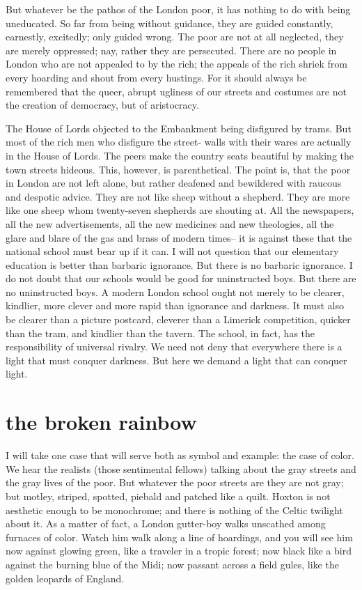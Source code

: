 \documentclass[final,10pt,letterpaper,twocolumn,openany]{book}
\begin{document}
But whatever be the pathos of the London poor, it has nothing to do
with being uneducated. So far from being without guidance, they are
guided constantly, earnestly, excitedly; only guided wrong. The poor are
not at all neglected, they are merely oppressed; nay, rather they are
persecuted. There are no people in London who are not appealed to by the
rich; the appeals of the rich shriek from every hoarding and shout from
every hustings. For it should always be remembered that the queer, abrupt
ugliness of our streets and costumes are not the creation of democracy, but
of aristocracy. 

The House of Lords objected to the Embankment being
disfigured by trams. But most of the rich men who disfigure the street-
walls with their wares are actually in the House of Lords. The peers make
the country seats beautiful by making the town streets hideous. This,
however, is parenthetical. The point is, that the poor in London are not left
alone, but rather deafened and bewildered with raucous and despotic
advice. They are not like sheep without a shepherd. They are more like
one sheep whom twenty-seven shepherds are shouting at. All the
newspapers, all the new advertisements, all the new medicines and new
theologies, all the glare and blare of the gas and brass of modern times-- it
is against these that the national school must bear up if it can. I will not
question that our elementary education is better than barbaric ignorance.
But there is no barbaric ignorance. I do not doubt that our schools would
be good for uninstructed boys. But there are no uninstructed boys. A
modern London school ought not merely to be clearer, kindlier, more
clever and more rapid than ignorance and darkness. It must also be clearer
than a picture postcard, cleverer than a Limerick competition, quicker than
the tram, and kindlier than the tavern. The school, in fact, has the
responsibility of universal rivalry. We need not deny that everywhere there
is a light that must conquer darkness. But here we demand a light that can
conquer light.

\section{the broken rainbow}

    I will take one case that will serve both as symbol and example: the
case of color. We hear the realists (those sentimental fellows) talking about
the gray streets and the gray lives of the poor. But whatever the poor
streets are they are not gray; but motley, striped, spotted, piebald and
patched like a quilt. Hoxton is not aesthetic enough to be monochrome;
and there is nothing of the Celtic twilight about it. As a matter of fact, a
London gutter-boy walks unscathed among furnaces of color. Watch him
walk along a line of hoardings, and you will see him now against glowing
green, like a traveler in a tropic forest; now black like a bird against the
burning blue of the Midi; now passant across a field gules, like the golden
leopards of England. 
\end{document}
